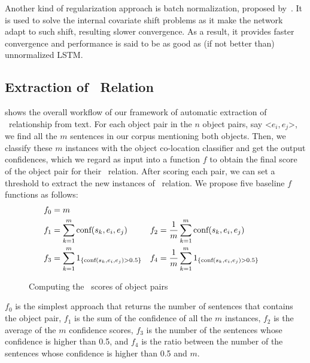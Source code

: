 Another kind of regularization approach is batch normalization, proposed by~\citeauthor{ioffe2015batch,cooijmans2016recurrent}. It is used to solve the internal covariate shift problems as it make the network adapt to such shift, resulting slower convergence. As a result, it provides faster convergence and performance is said to be as good as (if not better than) unnormalized LSTM. 

\subsection{Extraction of \lnear\ Relation}
\label{sec:mine}
%
%

 shows the overall workflow of our framework of
automatic extraction of \lnear\ relationship from text. 
For each object pair in the $n$ object pairs, say \textless$e_i,e_j$\textgreater , 
we find all the $m$ sentences in our corpus mentioning both objects. 
Then, we classify these $m$ instances with the object
co-location classifier and get the output confidences, which we regard as input into a function $f$ to obtain the final score of the object pair for their \lnear\ relation. After scoring each pair, we can set a threshold to extract the new instances of \lnear\ relation.
We propose five baseline $f$ functions as follows:
\begin{align*}
	f_0 &= m\\
	f_1&=\sum_{k=1}^{m} \textnormal{conf}(s_k,e_i,e_j) &f_2&=\frac{1}{m}\sum_{k=1}^{m} \textnormal{conf}(s_k,e_i,e_j)\\
	f_3&=\sum_{k=1}^{m}
	1_{ \{ \textnormal{conf}(s_k,e_i,e_j)>0.5 \} } 
	&f_4&=\frac{1}{m}\sum_{k=1}^{m} 
	1_{ \{ \textnormal{conf}(s_k,e_i,e_j)>0.5 \} }
\end{align*}

\begin{figure*}[th]
	\centering
	\caption{Computing the \lnear\ scores of object pairs}
	\label{fig:overview}
\end{figure*}
$f_0$ is the simplest approach that returns the number of sentences
that contains the object pair,
$f_1$ is the sum of the confidence of all the $m$ instances, $f_2$ is the average of the $m$ confidence scores, 
$f_3$ is the number of the sentences whose confidence is higher than 0.5, 
and $f_4$ is the ratio between the number of the sentences whose confidence is higher than 0.5 and $m$.

